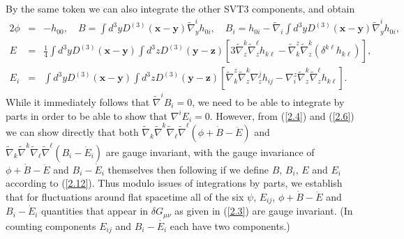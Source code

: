 \documentclass[aps,onecolumn,10pt]{revtex4}
\numberwithin{equation}{section}
\numberwithin{equation}{section}
\begin{document}
By the same token we can also integrate the other SVT3 components, and obtain 
%
 \begin{eqnarray}
2\phi&=&-h_{00},\quad
B=\int d^3yD^{(3)}(\mathbf{x}-\mathbf{y})\tilde{\nabla}_y^ih_{0i},\quad B_i=h_{0i}-\tilde{\nabla}_i\int d^3yD^{(3)}(\mathbf{x}-\mathbf{y})\tilde{\nabla}_y^ih_{0i},
\nonumber\\
E&=&\frac{1}{4}\int d^3yD^{(3)}(\mathbf{x}-\mathbf{y})\int d^3zD^{(3)}(\mathbf{y}-\mathbf{z})\left[3\tilde{\nabla}_z^k\tilde{\nabla}_z^{\ell}h_{k\ell}-\tilde{\nabla}^z_k\tilde{\nabla}_z^k(\delta^{k\ell}h_{k\ell})\right],
\nonumber\\
E_i&=&\int d^3yD^{(3)}(\mathbf{x}-\mathbf{y})\int d^3zD^{(3)}(\mathbf{y}-\mathbf{z})\left[\tilde{\nabla}^z_k\tilde{\nabla}_z^k\nabla_z^jh_{ij}-\nabla^z_i\tilde{\nabla}_z^k\tilde{\nabla}_z^{\ell}h_{k\ell}\right].
\label{2.12}
\end{eqnarray}
%
While it immediately follows that $\tilde{\nabla}^iB_i=0$,  we need to be able to integrate by parts in order to be able to show that $\nabla^iE_i=0$. However, from (\ref{2.4}) and (\ref{2.6}) we can show directly that both $\tilde{\nabla}_k\tilde{\nabla}^k\tilde{\nabla}_{\ell}\tilde{\nabla}^{\ell}(\phi+\dot{B}-\ddot{E})$ and $\tilde{\nabla}_k\tilde{\nabla}^k\tilde{\nabla}_{\ell}\tilde{\nabla}^{\ell}(B_i-\dot{E}_i)$ are gauge invariant, with the gauge invariance of $\phi+\dot{B}-\ddot{E}$ and $B_i-\dot{E}_i$ themselves then following if we define $B$, $B_i$, $E$ and $E_i$ according to (\ref{2.12}). Thus modulo issues of integrations by parts, we establish that for fluctuations around flat spacetime all of the six $\psi$, $E_{ij}$,  $\phi+\dot{B}-\ddot{E}$ and $B_i-\dot{E}_i$ quantities that appear in $\delta G_{\mu\nu}$ as given in (\ref{2.3}) are gauge invariant. (In counting components $E_{ij}$ and $B_i-\dot{E_i}$ each have two components.)
\end{document}
